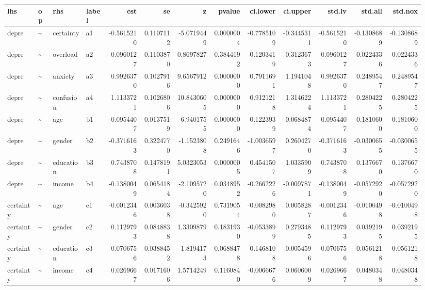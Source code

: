 \documentclass[
]{article}
\begin{document}
\begin{table}[!h]
\centering
\begin{tabular}[t]{llllrrrrrrrrr}
\toprule
lhs & op & rhs & label & est & se & z & pvalue & ci.lower & ci.upper & std.lv & std.all & std.nox\\
\midrule
depre & \textasciitilde{} & certainty & a1 & -0.5615210 & 0.1107112 & -5.0719449 & 0.0000004 & -0.7785109 & -0.3445311 & -0.5615210 & -0.1308689 & -0.1308689\\
depre & \textasciitilde{} & overload & a2 & 0.0960127 & 0.1103870 & 0.8697827 & 0.3844192 & -0.1203419 & 0.3123673 & 0.0960127 & 0.0224336 & 0.0224336\\
depre & \textasciitilde{} & anxiety & a3 & 0.9926370 & 0.1027916 & 9.6567912 & 0.0000000 & 0.7911691 & 1.1941048 & 0.9926370 & 0.2489547 & 0.2489547\\
depre & \textasciitilde{} & confusion & a4 & 1.1133721 & 0.1026806 & 10.8430605 & 0.0000000 & 0.9121218 & 1.3146224 & 1.1133721 & 0.2804225 & 0.2804225\\
depre & \textasciitilde{} & age & b1 & -0.0954407 & 0.0137519 & -6.9401755 & 0.0000000 & -0.1223939 & -0.0684874 & -0.0954407 & -0.1810600 & -0.1810600\\
\addlinespace
depre & \textasciitilde{} & gender & b2 & -0.3716163 & 0.3224770 & -1.1523808 & 0.2491646 & -1.0036597 & 0.2604270 & -0.3716163 & -0.0300655 & -0.0300655\\
depre & \textasciitilde{} & education & b3 & 0.7438708 & 0.1478191 & 5.0323053 & 0.0000005 & 0.4541507 & 1.0335909 & 0.7438708 & 0.1376670 & 0.1376670\\
depre & \textasciitilde{} & income & b4 & -0.1380049 & 0.0654184 & -2.1095720 & 0.0348952 & -0.2662226 & -0.0097871 & -0.1380049 & -0.0572920 & -0.0572920\\
certainty & \textasciitilde{} & age & c1 & -0.0012346 & 0.0036038 & -0.3425920 & 0.7319054 & -0.0082980 & 0.0058287 & -0.0012346 & -0.0100498 & -0.0100498\\
certainty & \textasciitilde{} & gender & c2 & 0.1129793 & 0.0848838 & 1.3309879 & 0.1831930 & -0.0533899 & 0.2793485 & 0.1129793 & 0.0392195 & 0.0392195\\
\addlinespace
certainty & \textasciitilde{} & education & c3 & -0.0706756 & 0.0388452 & -1.8194173 & 0.0688478 & -0.1468108 & 0.0054596 & -0.0706756 & -0.0561218 & -0.0561218\\
certainty & \textasciitilde{} & income & c4 & 0.0269667 & 0.0171606 & 1.5714249 & 0.1160840 & -0.0066676 & 0.0606009 & 0.0269667 & 0.0480348 & 0.0480348\\

\end{tabular}
\end{table}
\end{document}

